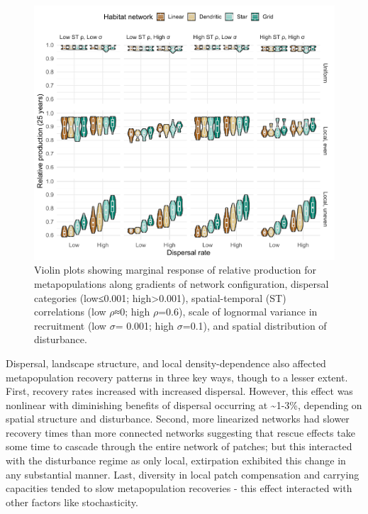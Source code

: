 \documentclass[
]{article}
\begin{document}
\begin{figure}[H]

{\centering \includegraphics{Managing_for_ecological_surprises_in_metapopulations_files/figure-latex/violin plots of risk of relative production-1} 

}

\caption{Violin plots showing marginal response of relative production for metapopulations along gradients of network configuration, dispersal categories (low≤0.001; high>0.001), spatial-temporal (ST) correlations (low $\rho$≈0; high $\rho$=0.6), scale of lognormal variance in recruitment (low $\sigma$= 0.001; high $\sigma$=0.1), and spatial distribution of disturbance.}\label{fig:violin plots of risk of relative production}
\end{figure}

Dispersal, landscape structure, and local density-dependence also
affected metapopulation recovery patterns in three key ways, though to a
lesser extent. First, recovery rates increased with increased dispersal.
However, this effect was nonlinear with diminishing benefits of
dispersal occurring at \textasciitilde1-3\%, depending on spatial
structure and disturbance. Second, more linearized networks had slower
recovery times than more connected networks suggesting that rescue
effects take some time to cascade through the entire network of patches;
but this interacted with the disturbance regime as only local,
extirpation exhibited this change in any substantial manner. Last,
diversity in local patch compensation and carrying capacities tended to
slow metapopulation recoveries - this effect interacted with other
factors like stochasticity.
\end{document}
